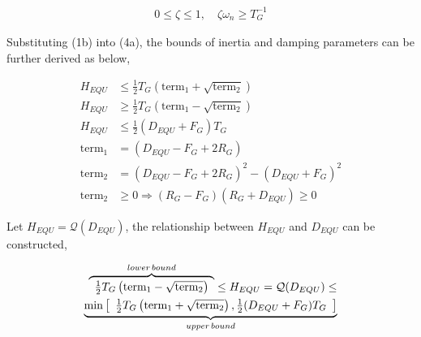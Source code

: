 \documentclass[lettersize,journal]{IEEEtran}
\begin{document}
\vspace{-0.25cm}
\begin{subequations}
  \begin{align}
    0 \leq \zeta \leq 1, \quad \zeta \omega_n \geq {T_G^{-1}} \label{eq:zeta_wn}
    \end{align}
  \end{subequations}

Substituting (1b) into (4a), the bounds of inertia and damping parameters can be further derived as below,

\vspace{-0.25cm}
\begin{subequations}
  \begin{align}
    H_{EQU} &\leq \frac{1}{2}T_G \left(\text{term}_1 + \sqrt{\text{term}_2} \right) \\
    H_{EQU} &\geq \frac{1}{2}T_G \left(\text{term}_1 - \sqrt{\text{term}_2} \right) \\
    H_{EQU} &\leq \frac{1}{2} (D_{EQU} + F_G) T_{G} \\
    \text{term}_1 &= (D_{EQU} - F_G + 2R_G) \\
    \text{term}_2 &= {(D_{EQU} - F_G + 2R_G)^2 - (D_{EQU} + F_G)^2}\\
    \text{term}_2 &\geq 0 \Longrightarrow (R_G - F_G)(R_G + D_{EQU}) \geq 0
    \end{align}
  \end{subequations}

Let $H_{EQU}=\mathcal{Q} (D_{EQU})$, the relationship between $H_{EQU}$ and $D_{EQU}$ can be constructed,

\vspace{-0.25cm}
\begin{subequations}
  \begin{align}
    \overbrace{\begin{array}{l}\frac{1}{2}T_G \left(\text{term}_1 - \sqrt{\text{term}_2} \right)\end{array}}^{lower\,bound} \leq H_{EQU}=\mathcal{Q} (D_{EQU}) \leq \notag \\
    \underbrace{\min \left [
    \begin{array}{l}
      \frac{1}{2}T_G \left(\text{term}_1 + \sqrt{\text{term}_2}\right), \frac{1}{2} (D_{EQU} + F_G) T_{G}\\
    \end{array} \right ]
    }_{upper\, bound}
    \end{align}
  \end{subequations}
\end{document}
